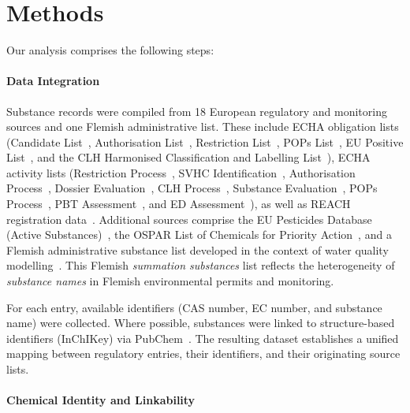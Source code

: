 \section{Methods}
\label{sec:methods}

Our analysis comprises the following steps:
\nopagebreak

\paragraph{Data Integration}

Substance records were compiled from 18 European regulatory and monitoring sources and one Flemish administrative list. These include ECHA obligation lists (Candidate List~\cite{ECHA_CandidateList}, Authorisation List~\cite{ECHA_AuthorisationList}, Restriction List~\cite{ECHA_RestrictionList}, POPs List~\cite{ECHA_POPsList}, EU Positive List~\cite{ECHA_EUPositiveList}, and the CLH Harmonised Classification and Labelling List~\cite{ECHA_CLHList}), ECHA activity lists (Restriction Process~\cite{ECHA_RestrictionProcess}, SVHC Identification~\cite{ECHA_SVHCIdentification}, Authorisation Process~\cite{ECHA_AuthorisationProcess}, Dossier Evaluation~\cite{ECHA_DossierEvaluation}, CLH Process~\cite{ECHA_CLHProcess}, Substance Evaluation~\cite{ECHA_SubstanceEvaluation}, POPs Process~\cite{ECHA_POPsProcess}, PBT Assessment~\cite{ECHA_PBTAssessment}, and ED Assessment~\cite{ECHA_EDAssessment}), as well as REACH registration data~\cite{ECHA_REACHRegistrations}. 
Additional sources comprise the EU Pesticides Database (Active Substances)~\cite{EU_Pesticides}, the OSPAR List of Chemicals for Priority Action~\cite{OSPAR_PriorityChemicals}, and a Flemish administrative substance list developed in the context of water quality modelling~\cite{Vlaanderen_SommatieStoffen}. This Flemish \emph{summation substances} list reflects the heterogeneity of \emph{substance names} in Flemish environmental permits and monitoring. 

For each entry, available identifiers (CAS number, EC number, and substance name) were collected. Where possible, substances were linked to structure-based identifiers (InChIKey) via PubChem~\cite{Kim2015}. The resulting dataset establishes a unified mapping between regulatory entries, their identifiers, and their originating source lists.

\paragraph{Chemical Identity and Linkability}
\label{sec:linkability}

